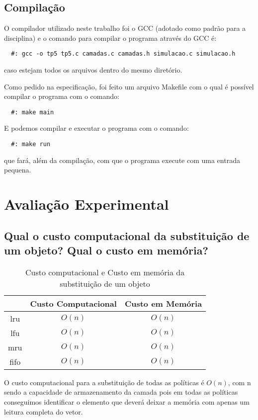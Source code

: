 \documentclass[12pt]{article}
\begin{document}
\subsection{Compilação}
O compilador utilizado neste trabalho foi o GCC (adotado como padrão para a disciplina) e 
o comando para compilar o programa através do GCC é:
\begin{verbatim}
  #: gcc -o tp5 tp5.c camadas.c camadas.h simulacao.c simulacao.h
\end{verbatim}
caso estejam todos os arquivos dentro do mesmo diretório.

Como pedido na especificação, foi feito um arquivo Makefile com o qual é possível compilar
o programa com o comando: 
\begin{verbatim}
  #: make main
\end{verbatim}

E podemos compilar e executar o programa com o comando:
\begin{verbatim}
  #: make run
\end{verbatim}
que fará, além da compilação, com que o programa execute com uma entrada pequena.

\section{Avaliação Experimental}
\label{avaliacao_experimental}

\subsection{Qual o custo computacional da substituição de um objeto? Qual o custo em memória?}

\begin{table}[htb]
\centering
\caption{Custo computacional e Custo em memória da substituição de um objeto}
\begin{tabular}{|c|c|c|}
\hline  & Custo Computacional & Custo em Memória \\ 
\hline lru & $O(n)$ & $O(n)$ \\ 
\hline lfu & $O(n)$ & $O(n)$ \\ 
\hline mru & $O(n)$ & $O(n)$ \\ 
\hline fifo & $O(n)$ & $O(n)$ \\ 
\hline 
\end{tabular}
\end{table}

O custo computacional para a substituição de todas as políticas é $O(n)$, com n
sendo a capacidade de armazenamento da camada pois em todas as políticas conseguimos 
identificar o elemento que deverá deixar a memória com apenas um leitura completa do 
vetor.
\end{document}
